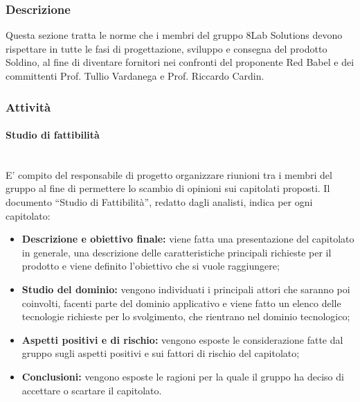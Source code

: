 \subsubsection{Descrizione}
Questa sezione tratta le norme che i membri del gruppo 8Lab Solutions devono rispettare in tutte le fasi di progettazione, sviluppo e consegna del prodotto Soldino, al fine di diventare fornitori nei confronti del proponente Red Babel e dei committenti Prof. Tullio Vardanega e Prof. Riccardo Cardin.
\subsubsection{Attività}
\paragraph{Studio di fattibilità} \mbox{}\\ 
E' compito del responsabile di progetto organizzare riunioni tra i membri del gruppo al fine di permettere lo scambio di opinioni sui capitolati proposti.
Il documento ``Studio di Fattibilità'', redatto dagli analisti, indica per ogni capitolato:
\begin{itemize}
	\item \textbf{Descrizione e obiettivo finale:} viene fatta una presentazione del capitolato in generale, una descrizione delle caratteristiche principali richieste per il prodotto e viene definito l'obiettivo che si vuole raggiungere;
	\item \textbf{Studio del dominio:} vengono individuati i principali attori che saranno poi coinvolti, facenti parte del dominio applicativo e viene fatto un elenco delle tecnologie richieste per lo svolgimento, che rientrano nel dominio tecnologico;
	\item \textbf{Aspetti positivi e di rischio:} vengono esposte le considerazione fatte dal gruppo sugli aspetti positivi e sui fattori di rischio del capitolato;
	\item \textbf{Conclusioni:} vengono esposte le ragioni per la quale il gruppo ha deciso di accettare o scartare il capitolato.
\end{itemize}
